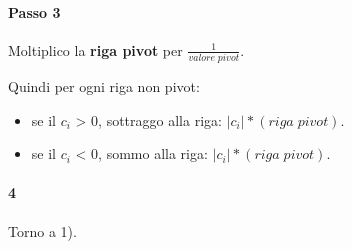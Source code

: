 \paragraph{Passo 3}

Moltiplico la \textbf{riga pivot} per $\frac {1} {valore \; pivot}$.

Quindi per ogni riga non pivot:
\begin{itemize}
    \item se il $c_i$ > 0, sottraggo alla riga: $|c_i| * (riga \; pivot)$.
    \item se il $c_i$ < 0, sommo alla riga: $|c_i| * (riga \; pivot)$.
\end{itemize}

\paragraph{4}

Torno a 1).
